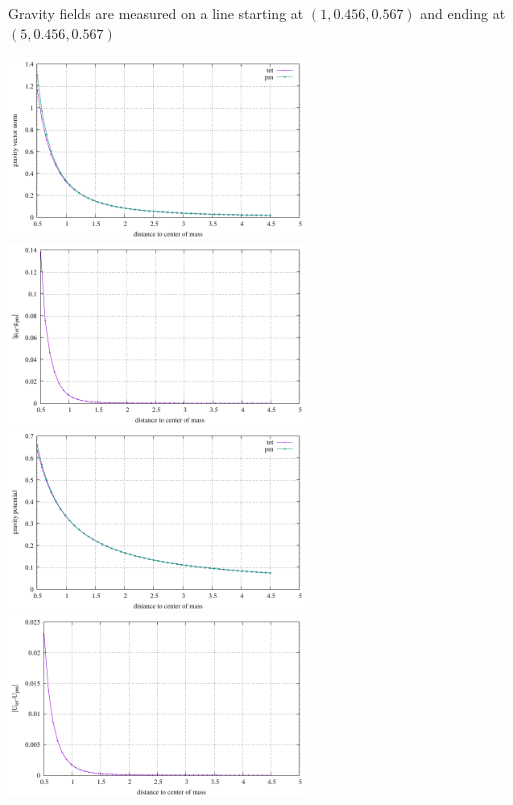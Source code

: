 Gravity fields are measured on a line starting at $(1,0.456,0.567)$ and ending at $(5,0.456,0.567)$
\begin{center}
\includegraphics[width=8cm]{python_codes/fieldstone_113/results/test2/g_vector.pdf}
\includegraphics[width=8cm]{python_codes/fieldstone_113/results/test2/g_vector_diff.pdf}\\
\includegraphics[width=8cm]{python_codes/fieldstone_113/results/test2/g_pot.pdf}
\includegraphics[width=8cm]{python_codes/fieldstone_113/results/test2/g_pot_diff.pdf}
\end{center}


